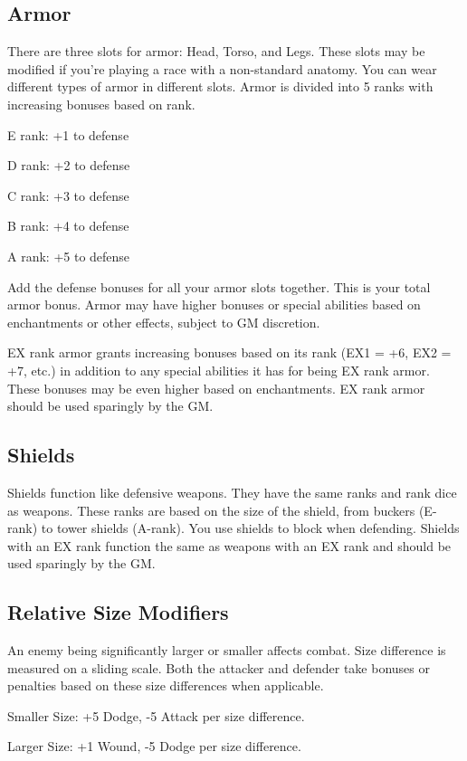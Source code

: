 \begin{multicols}{2}
\subsection{Armor}
There are three slots for armor: Head, Torso, and Legs. These slots may be modified if you're playing a race with a non-standard anatomy. You can wear different types of armor in different slots. Armor is divided into 5 ranks with increasing bonuses based on rank.
\begin{wldescription}
\item [E rank:] +1 to defense
\item [D rank:] +2 to defense
\item [C rank:] +3 to defense
\item [B rank:] +4 to defense
\item [A rank:] +5 to defense
\end{wldescription}
Add the defense bonuses for all your armor slots together. This is your total armor bonus.
Armor may have higher bonuses or special abilities based on enchantments or other effects, subject to GM discretion.

EX rank armor grants increasing bonuses based on its rank (EX1 = +6, EX2 = +7, etc.) in addition to any special abilities it has for being EX rank armor. These bonuses may be even higher based on enchantments. EX rank armor should be used sparingly by the GM.


\subsection{Shields}
Shields function like defensive weapons. They have the same ranks and rank dice as weapons. These ranks are based on the size of the shield, from buckers (E-rank) to tower shields (A-rank). You use shields to block when defending. Shields with an EX rank function the same as weapons with an EX rank and should be used sparingly by the GM.



\subsection{Relative Size Modifiers}
An enemy being significantly larger or smaller affects combat. Size difference is measured on a sliding scale. Both the attacker and defender take bonuses or penalties based on these size differences when applicable.
\begin{wldescription}
\item [Smaller Size:] +5 Dodge, -5 Attack per size difference.
\item [Larger Size:] +1 Wound, -5 Dodge per size difference.
\end{wldescription}


\end{multicols}
